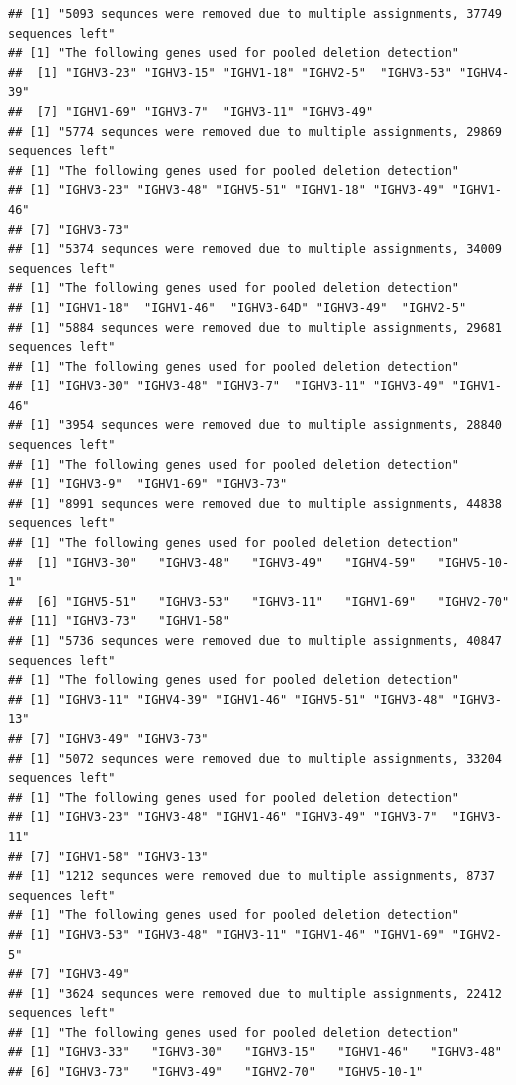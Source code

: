 \documentclass[11pt,]{article}
\begin{document}
\begin{verbatim}
## [1] "5093 sequnces were removed due to multiple assignments, 37749 sequences left"
## [1] "The following genes used for pooled deletion detection"
##  [1] "IGHV3-23" "IGHV3-15" "IGHV1-18" "IGHV2-5"  "IGHV3-53" "IGHV4-39"
##  [7] "IGHV1-69" "IGHV3-7"  "IGHV3-11" "IGHV3-49"
## [1] "5774 sequnces were removed due to multiple assignments, 29869 sequences left"
## [1] "The following genes used for pooled deletion detection"
## [1] "IGHV3-23" "IGHV3-48" "IGHV5-51" "IGHV1-18" "IGHV3-49" "IGHV1-46"
## [7] "IGHV3-73"
## [1] "5374 sequnces were removed due to multiple assignments, 34009 sequences left"
## [1] "The following genes used for pooled deletion detection"
## [1] "IGHV1-18"  "IGHV1-46"  "IGHV3-64D" "IGHV3-49"  "IGHV2-5"  
## [1] "5884 sequnces were removed due to multiple assignments, 29681 sequences left"
## [1] "The following genes used for pooled deletion detection"
## [1] "IGHV3-30" "IGHV3-48" "IGHV3-7"  "IGHV3-11" "IGHV3-49" "IGHV1-46"
## [1] "3954 sequnces were removed due to multiple assignments, 28840 sequences left"
## [1] "The following genes used for pooled deletion detection"
## [1] "IGHV3-9"  "IGHV1-69" "IGHV3-73"
## [1] "8991 sequnces were removed due to multiple assignments, 44838 sequences left"
## [1] "The following genes used for pooled deletion detection"
##  [1] "IGHV3-30"   "IGHV3-48"   "IGHV3-49"   "IGHV4-59"   "IGHV5-10-1"
##  [6] "IGHV5-51"   "IGHV3-53"   "IGHV3-11"   "IGHV1-69"   "IGHV2-70"  
## [11] "IGHV3-73"   "IGHV1-58"  
## [1] "5736 sequnces were removed due to multiple assignments, 40847 sequences left"
## [1] "The following genes used for pooled deletion detection"
## [1] "IGHV3-11" "IGHV4-39" "IGHV1-46" "IGHV5-51" "IGHV3-48" "IGHV3-13"
## [7] "IGHV3-49" "IGHV3-73"
## [1] "5072 sequnces were removed due to multiple assignments, 33204 sequences left"
## [1] "The following genes used for pooled deletion detection"
## [1] "IGHV3-23" "IGHV3-48" "IGHV1-46" "IGHV3-49" "IGHV3-7"  "IGHV3-11"
## [7] "IGHV1-58" "IGHV3-13"
## [1] "1212 sequnces were removed due to multiple assignments, 8737 sequences left"
## [1] "The following genes used for pooled deletion detection"
## [1] "IGHV3-53" "IGHV3-48" "IGHV3-11" "IGHV1-46" "IGHV1-69" "IGHV2-5" 
## [7] "IGHV3-49"
## [1] "3624 sequnces were removed due to multiple assignments, 22412 sequences left"
## [1] "The following genes used for pooled deletion detection"
## [1] "IGHV3-33"   "IGHV3-30"   "IGHV3-15"   "IGHV1-46"   "IGHV3-48"  
## [6] "IGHV3-73"   "IGHV3-49"   "IGHV2-70"   "IGHV5-10-1"
\end{verbatim}
\end{document}
